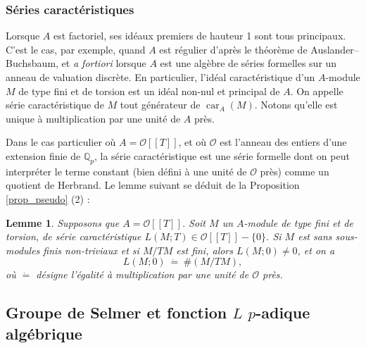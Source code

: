\documentclass[12pt]{amsart}
\newcommand\Qp{\mathbb{Q}_{p}}
\newcommand\cO{\mathcal{O}}
\DeclareMathOperator{\car}{car}
\theoremstyle{defstyle}
\theoremstyle{thmstyle}
\newtheorem{lemme}[subsubsection]{Lemme}
\begin{document}
\subsubsection{Séries caractéristiques}
Lorsque $A$ est factoriel, ses idéaux premiers de hauteur 1 sont tous principaux. C'est le cas, par exemple, quand $A$ est régulier d'après le théorème de Auslander–Buchsbaum, et \textit{a fortiori} lorsque $A$ est une algèbre de séries formelles sur un anneau de valuation discrète. En particulier, l'idéal caractéristique d'un $A$-module $M$ de type fini et de torsion est un idéal non-nul et principal de $A$. On appelle série caractéristique de $M$ tout générateur de $\car_A(M)$. Notons qu'elle est unique à multiplication par une unité de $A$ près.

Dans le cas particulier où $A={\cO}[[T]]$, et où ${\cO}$ est l'anneau des entiers d'une extension finie de $\Qp$, la série caractéristique est une série formelle dont on peut interpréter le terme constant (bien défini à une unité de $\cO$ près) comme un quotient de Herbrand. Le lemme suivant se déduit de la Proposition \ref{prop_pseudo} (2) :

\begin{lemme}\label{cst}
	Supposons que $A={\cO}[[T]]$. Soit $M$ un $A$-module de type fini et de torsion, de série caractéristique $L(M;T)\in \cO[[T]]-\{0\}$. Si $M$ est sans sous-modules finis non-triviaux et si $M/TM$ est fini, alors $L(M;0)\neq 0$, et on a 
	$$L(M;0)\ \dot{=}\ \#(M/TM),$$
	où $\dot{=}$ désigne l'égalité à multiplication par une unité de ${\cO}$ près.
\end{lemme}

\subsection{Groupe de Selmer et fonction $L$ $p$-adique algébrique}
\end{document}

